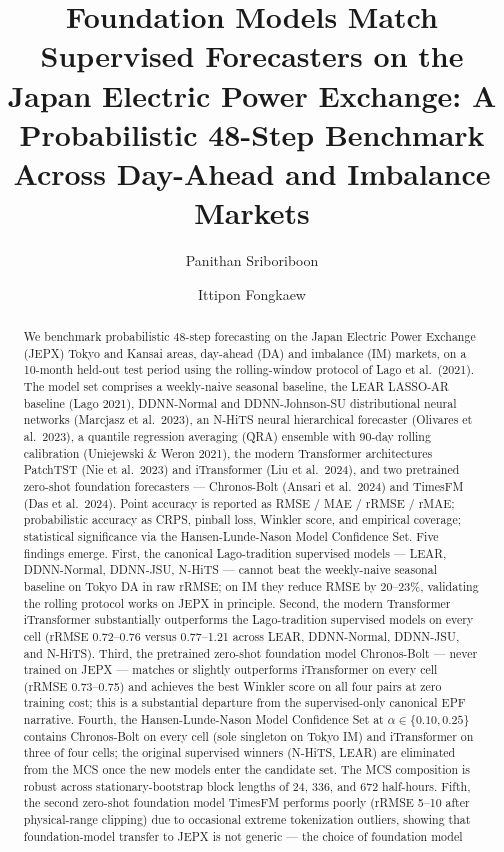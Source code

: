 \documentclass[review,3p,times,authoryear]{elsarticle}
\begin{document}
\begin{frontmatter}

\title{Foundation Models Match Supervised Forecasters on the Japan Electric Power Exchange: A Probabilistic 48-Step Benchmark Across Day-Ahead and Imbalance Markets}

\author[sut]{Panithan Sriboriboon}
\author[sut]{Ittipon Fongkaew}
\address[sut]{School of Physics, Institute of Science, Suranaree University of Technology,
Nakhon Ratchasima 30000, Thailand}

\begin{abstract}
We benchmark probabilistic 48-step forecasting on the Japan Electric Power Exchange (JEPX) Tokyo and Kansai areas, day-ahead (DA) and imbalance (IM) markets, on a 10-month held-out test period using the rolling-window protocol of Lago et al.\ (2021). The model set comprises a weekly-naive seasonal baseline, the LEAR LASSO-AR baseline (Lago 2021), DDNN-Normal and DDNN-Johnson-SU distributional neural networks (Marcjasz et al.\ 2023), an N-HiTS neural hierarchical forecaster (Olivares et al.\ 2023), a quantile regression averaging (QRA) ensemble with 90-day rolling calibration (Uniejewski \& Weron 2021), the modern Transformer architectures PatchTST (Nie et al.\ 2023) and iTransformer (Liu et al.\ 2024), and two pretrained zero-shot foundation forecasters --- Chronos-Bolt (Ansari et al.\ 2024) and TimesFM (Das et al.\ 2024). Point accuracy is reported as RMSE / MAE / rRMSE / rMAE; probabilistic accuracy as CRPS, pinball loss, Winkler score, and empirical coverage; statistical significance via the Hansen-Lunde-Nason Model Confidence Set. Five findings emerge. First, the canonical Lago-tradition supervised models --- LEAR, DDNN-Normal, DDNN-JSU, N-HiTS --- cannot beat the weekly-naive seasonal baseline on Tokyo DA in raw rRMSE; on IM they reduce RMSE by 20--23\%, validating the rolling protocol works on JEPX in principle. Second, the modern Transformer iTransformer substantially outperforms the Lago-tradition supervised models on every cell (rRMSE 0.72--0.76 versus 0.77--1.21 across LEAR, DDNN-Normal, DDNN-JSU, and N-HiTS). Third, the pretrained zero-shot foundation model Chronos-Bolt --- never trained on JEPX --- matches or slightly outperforms iTransformer on every cell (rRMSE 0.73--0.75) and achieves the best Winkler score on all four pairs at zero training cost; this is a substantial departure from the supervised-only canonical EPF narrative. Fourth, the Hansen-Lunde-Nason Model Confidence Set at \(\alpha\in\{0.10, 0.25\}\) contains Chronos-Bolt on every cell (sole singleton on Tokyo IM) and iTransformer on three of four cells; the original supervised winners (N-HiTS, LEAR) are eliminated from the MCS once the new models enter the candidate set. The MCS composition is robust across stationary-bootstrap block lengths of 24, 336, and 672 half-hours. Fifth, the second zero-shot foundation model TimesFM performs poorly (rRMSE 5--10 after physical-range clipping) due to occasional extreme tokenization outliers, showing that foundation-model transfer to JEPX is not generic --- the choice of foundation model 
\end{abstract}
\end{frontmatter}
\end{document}
